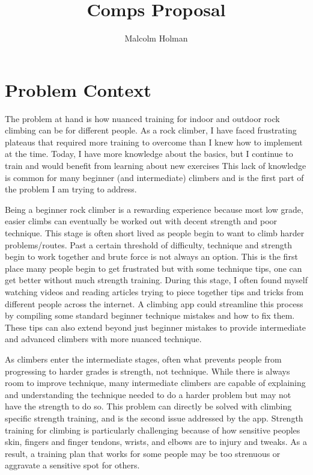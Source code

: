 \documentclass[10pt,twocolumn]{article}
\title{Comps Proposal}
\author{Malcolm Holman}
\affiliation{Occidental College}
\begin{document}
\maketitle

\section{Problem Context}

    The problem at hand is how nuanced training for indoor and outdoor rock climbing can be for different people. As a rock climber, I have faced frustrating plateaus that required more training to overcome than I knew how to implement at the time. Today, I have more knowledge about the basics, but I continue to train and would benefit from learning about new exercises This lack of knowledge is common for many beginner (and intermediate) climbers and is the first part of the problem I am trying to address. 

	Being a beginner rock climber is a rewarding experience because most low grade, easier climbs can eventually be worked out with decent strength and poor technique. This stage is often short lived as people begin to want to climb harder problems/routes. Past a certain threshold of difficulty, technique and strength begin to work together and brute force is not always an option. This is the first place many people begin to get frustrated but with some technique tips, one can get better without much strength training. During this stage, I often found myself watching videos and reading articles trying to piece together tips and tricks from different people across the internet. A climbing app could streamline this process by compiling some standard beginner technique mistakes and how to fix them. These tips can also extend beyond just beginner mistakes to provide intermediate and advanced climbers with more nuanced technique. 

	As climbers enter the intermediate stages, often what prevents people from progressing to harder grades is strength, not technique. While there is always room to improve technique, many intermediate climbers are capable of explaining and understanding the technique needed to do a harder problem but may not have the strength to do so. This problem can directly be solved with climbing specific strength training, and is the second issue addressed by the app. Strength training for climbing is particularly challenging because of how sensitive peoples skin, fingers and finger tendons, wrists, and elbows are to injury and tweaks. As a result, a training plan that works for some people may be too strenuous or aggravate a sensitive spot for others. 
	
\end{document}
